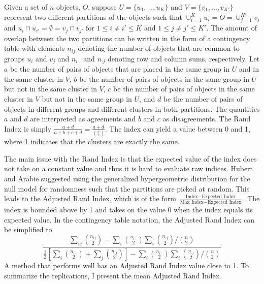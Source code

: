 Given a set of $n$ objects, $O$, suppose $U = \{u_{1},...,u_{K}\}$ and $V=\{v_{1},...,v_{K'}\}$ represent two different partitions of the objects such that $\cup^{K}_{i=1}u_{i} = O = \cup^{K'}_{j=1}v_{j}$ and $u_{i}\cap u_{i'} = \emptyset = v_{j}\cap v_{j'}$ for $1\leq i\not=i'\leq K$ and $1\leq j\not= j'\leq K'$. The amount of overlap between the two partitions can be written in the form of a contingency table with elements $n_{ij}$ denoting the number of objects that are common to groups $u_{i}$ and $v_{j}$ and $n_{i\cdot}$ and $n_{\cdot j}$ denoting row and column sums, respectively. Let $a$ be the number of pairs of objects that are placed in the same group in $U$ and in the same cluster in $V$, $b$ be the number of pairs of objects in the same group in $U$ but not in the same cluster in $V$, $c$ be the number of pairs of objects in the same cluster in $V$ but not in the same group in $U$, and $d$ be the number of pairs of objects in different groups and different clusters in both partitions. The quantities $a$ and $d$ are interpreted as agreements and $b$ and $c$ as disagreements. The Rand Index \cite{rand1971} is simply $\frac{a+d}{a+b+c+d}=\frac{a+d}{{n \choose 2}}$.  The index can yield a value between 0 and 1, where 1 indicates that the clusters are exactly the same.

The main issue with the Rand Index is that the expected value of the index does not take on a constant value and thus it is hard to evaluate raw indices. Hubert and Arabie \cite{hubert1985} suggested using the generalized hypergeometric distribution for the null model for randomness such that the partitions are picked at random. This leads to the Adjusted Rand Index, which is of the form $\frac{\text{Index} - \text{Expected Index}}{\text{Max Index}-\text{Expected Index}}$. The index is bounded above by 1 and takes on the value 0 when the index equals its expected value. In the contingency table notation, the Adjusted Rand Index can be simplified to
$$\frac{\sum_{ij}{n_{ij} \choose 2} - \sum_{i} {n_{i\cdot} \choose 2} \sum_{i} {n_{\cdot j} \choose 2} / {n \choose 2}}{\frac{1}{2}\left[\sum_{i}{n_{i\cdot} \choose 2}+\sum_{j}{n_{\cdot j} \choose 2}\right] - \sum_{i} {n_{i\cdot} \choose 2} \sum_{i} {n_{\cdot j} \choose 2} / {n \choose 2}}$$
A method that performs well has an Adjusted Rand Index value close to 1. To summarize the replications, I present the mean Adjusted Rand Index.

